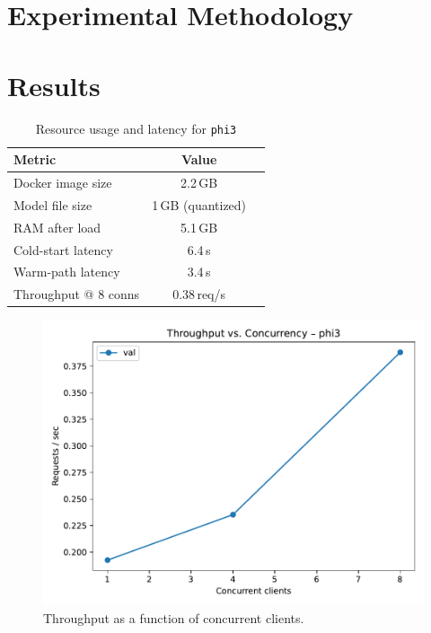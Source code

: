 \documentclass[conference]{IEEEtran}
\begin{document}
\section{Experimental Methodology}\label{sec:method}

\section{Results}\label{sec:results}


\begin{table}[t]
  \caption{Resource usage and latency for \texttt{phi3}}
  \label{tab:metrics}
  \centering
  \begin{tabular}{lcc}
    \toprule
    \textbf{Metric} & \textbf{Value} \\
    \midrule
    Docker image size   & 2.2\,GB \\
    Model file size     & 1\,GB (quantized) \\
    RAM after load      & 5.1\,GB \\
    Cold-start latency  & 6.4\,s \\
    Warm-path latency   & 3.4\,s \\
    Throughput @ 8 conns & 0.38\,req/s \\

    \bottomrule
  \end{tabular}
\end{table}


\begin{figure}[t]
  \centering
  \includegraphics[width=\linewidth]{throughput_vs_c}
  \caption{Throughput as a function of concurrent clients.}
  \label{fig:throughput}
\end{figure}
\vspace{0.6em}
\end{document}
